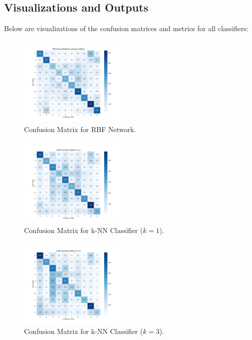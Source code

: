 \documentclass[lettersize,journal]{IEEEtran}
\begin{document}
\subsection{\textbf{Visualizations and Outputs}}
Below are visualizations of the confusion matrices and metrics for all classifiers:
\begin{figure}[H]
    \centering
    \includegraphics[width=0.48\textwidth]{conf_matrix_rbf.png}
    \caption{Confusion Matrix for RBF Network.}
    \label{fig:conf-matrix-rbf}
\end{figure}

\begin{figure}[H]
    \centering
    \includegraphics[width=0.48\textwidth]{conf_matrix_knn_k1.png}
    \caption{Confusion Matrix for k-NN Classifier ($k=1$).}
    \label{fig:conf-matrix-knn1}
\end{figure}

\begin{figure}[H]
    \centering
    \includegraphics[width=0.48\textwidth]{conf_matrix_knn_k3.png}
    \caption{Confusion Matrix for k-NN Classifier ($k=3$).}
    \label{fig:conf-matrix-knn3}
\end{figure}
\end{document}
